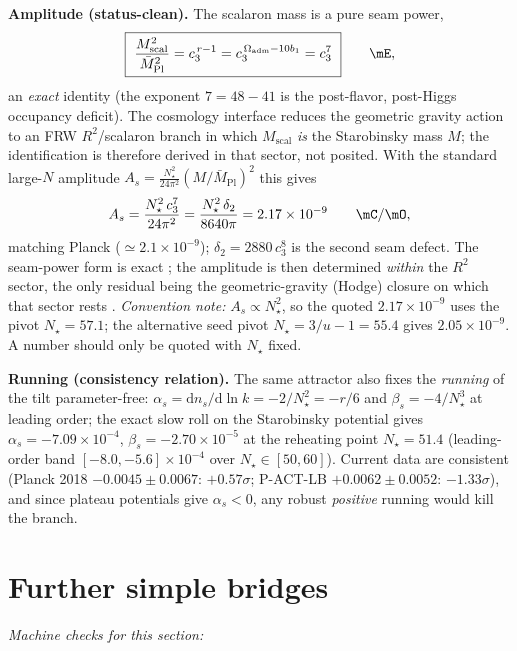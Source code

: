 \documentclass[11pt,a4paper]{article}
\newcommand{\Mbar}{\bar M_{\mathrm{Pl}}}
\newcommand{\Oadm}{\Omega_{\mathrm{adm}}}
\newcommand{\cthree}{c_3}
\newcommand{\useed}{u}
\newcommand{\dtwo}{\delta_2}
\theoremstyle{definition}
\begin{document}
\noindent\textbf{Amplitude (status-clean).} The scalaron mass is a pure seam power,
\begin{equation}
  \boxed{\ \frac{M_{\mathrm{scal}}^2}{\Mbar^2}=\cthree^{\,r-1}=\cthree^{\,\Oadm-10b_1}=\cthree^7\ }\qquad\mE ,
\end{equation}
an \emph{exact} identity (the exponent $7=48-41$ is the post-flavor, post-Higgs occupancy deficit).
The cosmology interface reduces the geometric gravity action to an FRW $R^2$/scalaron branch in which $M_{\mathrm{scal}}$
\emph{is} the Starobinsky mass $M$; the identification is therefore derived in that sector, not posited.
With the standard large-$N$ amplitude $A_s=\tfrac{N_\star^2}{24\pi^2}(M/\Mbar)^2$ this gives
\begin{equation}
  A_s=\frac{N_\star^2\,\cthree^7}{24\pi^2}=\frac{N_\star^2\,\dtwo}{8640\pi}=2.17\times10^{-9}\qquad\mC/\mO ,
\end{equation}
matching Planck ($\simeq2.1\times10^{-9}$); $\dtwo=2880\,\cthree^8$ is the second seam defect. The
seam-power form is exact \mE; the amplitude is then determined \emph{within} the $R^2$ sector, the only
residual being the geometric-gravity (Hodge) closure on which that sector rests \mC. \emph{Convention
note:} $A_s\propto N_\star^2$, so
the quoted $2.17\times10^{-9}$ uses the pivot $N_\star=57.1$; the alternative seed pivot $N_\star=3/\useed-1=55.4$
gives $2.05\times10^{-9}$. A number should only be quoted with $N_\star$ fixed.

\noindent\textbf{Running (consistency relation).} The same attractor also fixes the \emph{running}
of the tilt parameter-free: $\alpha_s=\mathrm dn_s/\mathrm d\ln k=-2/N_\star^2=-r/6$ and
$\beta_s=-4/N_\star^3$ at leading order; the exact slow roll on the Starobinsky potential gives
$\alpha_s=-7.09\times10^{-4}$, $\beta_s=-2.70\times10^{-5}$ at the reheating point $N_\star{=}51.4$
(leading-order band $[-8.0,-5.6]\times10^{-4}$ over $N_\star\in[50,60]$). Current data are
consistent (Planck 2018 $-0.0045\pm0.0067$: $+0.57\sigma$; P-ACT-LB $+0.0062\pm0.0052$:
$-1.33\sigma$), and since plateau potentials give $\alpha_s<0$, any robust \emph{positive} running
would kill the branch. \mC\ 

\section{Further simple bridges}
\noindent\emph{Machine checks for this section:} 
\end{document}
